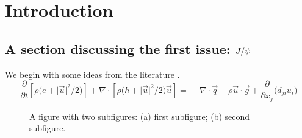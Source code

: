 

\chapter{Introduction}


\newcommand*{\Jpsi}{\ifpdftex\mathord{\bm{J}/\bm{\psi}}\else\mathord{\symbfit{J/\psi}}\fi} %

\section[A section discussing the first issue: \(J/\psi\)]{A section discussing the first issue: \( \Jpsi \) }

We begin with some ideas from the literature \cite{Fong2015,sharpe1}. 
\begin{equation}\label{eqn:1}
\frac{\partial}{\partial t}\left[\rho\bigl(e + \lvert\vec{u}\rvert^2\big/2\bigr)\right]  + \nabla\cdot\left[\rho\bigl(h + \lvert\vec{u}\rvert^2\big/2 \bigr)\vec{u}\right]
 ={}-\nabla \cdot \vec{q} +  \rho \vec{u}\cdot\vec{g}+ \frac{\partial}{\partial x_j}\bigl(d_{ji}u_i\bigr)
\end{equation}


\begin{figure}[t]
\begin{subfigure}[c]{0.495\textwidth}
%
\end{subfigure}
\begin{subfigure}[c]{0.495\textwidth}
%
%
\end{subfigure}%
\caption{A figure with two subfigures: (a) first subfigure; (b) second subfigure.\label{fig:4}}
\end{figure}

